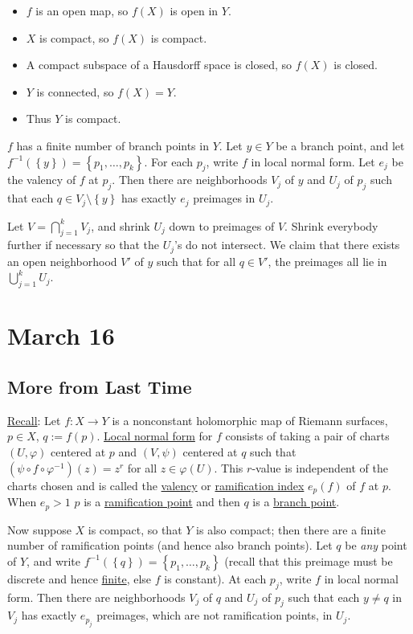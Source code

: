 \documentclass[12pt]{article}
\newcommand{\ita}[1]{\textit{#1}}
\newcommand\inv[1]{#1^{-1}}
\newcommand\setb[1]{\left \{ #1 \right \}}
\theoremstyle{definition}
\theoremstyle{remark}
\begin{document}
\begin{itemize}
    \item $f$ is an open map, so $f(X)$ is open in $Y$.
    \item $X$ is compact, so $f(X)$ is compact.
    \item A compact subspace of a Hausdorff space is closed, so $f(X)$ is closed.
    \item $Y$ is connected, so $f(X) = Y$.
    \item Thus $Y$ is compact.
\end{itemize}
$f$ has a finite number of branch points in $Y$. Let $y \in Y$ be a branch point, and let $\inv{f} \left( \setb{y} \right) = \setb{p_1 , \dotsc, p_k}$. For each $p_j$, write $f$ in local normal form. Let $e_j$ be the valency of $f$ at $p_j$. Then there are neighborhoods $V_j$ of $y$ and $U_j$ of $p_j$ such that each $q \in V_j \setminus \setb{y}$ has exactly $e_j$ preimages in $U_j$. 

Let $V = \bigcap\limits_{j = 1}^k V_j$, and shrink $U_j$ down to preimages of $V$. Shrink everybody further if necessary so that the $U_j$'s do not intersect. We claim that there exists an open neighborhood $V'$ of $y$ such that for all $q \in V'$, the preimages all lie in $\bigcup\limits_{j = 1}^k U_j$.
\section{March 16}
\subsection{More from Last Time}
\underline{Recall}: Let $f : X \to Y$ is a nonconstant holomorphic map of Riemann surfaces, $p \in X$, $q := f(p)$. \underline{Local normal form} for $f$ consists of taking a pair of charts $(U,\varphi)$ centered at $p$ and $(V,\psi)$ centered at $q$ such that $\left( \psi \circ f \circ \inv{\varphi} \right)(z) = z^r$ for all $z \in \varphi(U)$. This $r$-value is independent of the charts chosen and is called the \underline{valency} or \underline{ramification index} $e_p(f)$ of $f$ at $p$. When $e_p > 1$ $p$ is a \underline{ramification point} and then $q$ is a \underline{branch point}.

Now suppose $X$ is compact, so that $Y$ is also compact; then there are a finite number of ramification points (and hence also branch points). Let $q$ be \ita{any} point of $Y$, and write $\inv{f} \left( \setb{q} \right) = \setb{p_1 , \dotsc , p_k}$ (recall that this preimage must be discrete and hence \underline{finite}, else $f$ is constant). At each $p_j$, write $f$ in local normal form. Then there are neighborhoods $V_j$ of $q$ and $U_j$ of $p_j$ such that each $y \neq q$ in $V_j$ has exactly $e_{p_j}$ preimages, which are not ramification points, in $U_j$. 
\end{document}
